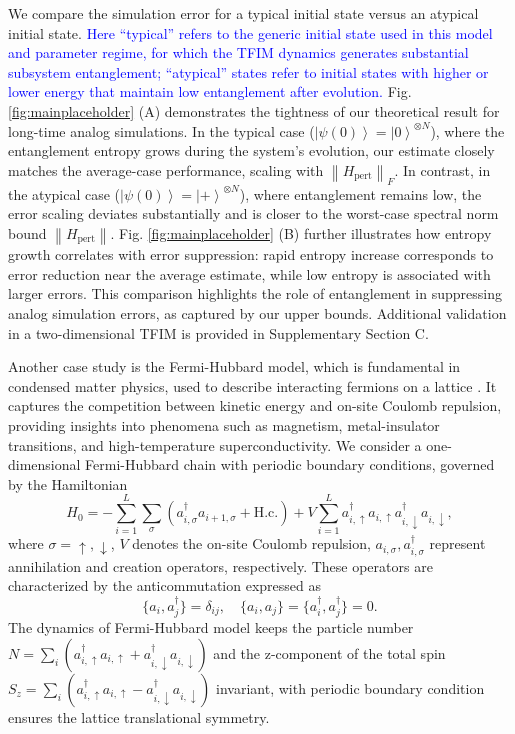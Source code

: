 \documentclass[12pt]{article}
\newcommand{\ket}[1]{\left|#1\right\rangle}
\newcommand{\norm}[1]{\left\lVert #1\right\rVert}
\begin{document}
We compare the simulation error
for a typical initial state versus an atypical initial state. \textcolor{blue}{Here ``typical'' refers to the generic initial state used in this model and parameter regime, for which the TFIM dynamics generates substantial subsystem entanglement; ``atypical'' states refer to initial states with higher or lower energy that maintain low entanglement after evolution.}
Fig. \ref{fig:mainplaceholder} (A) demonstrates the tightness of our theoretical result for long-time analog simulations. In the typical case ($\ket{\psi(0)}=\ket{0}^{\otimes N}$), where the entanglement entropy grows during the system's evolution, our estimate closely matches the average-case performance, scaling with $\norm{H_{\text{pert}}}_{F}$. In contrast, in the atypical case ($\ket{\psi(0)}=\ket{+}^{\otimes N}$), where entanglement remains low, the error scaling deviates substantially and is closer to the worst-case spectral norm bound $\norm{H_{\text{pert}}}$. 
Fig. \ref{fig:mainplaceholder} (B) further illustrates how entropy growth correlates with error suppression: rapid entropy increase corresponds to error reduction near the average estimate, while low entropy is associated with larger errors. This comparison highlights the role of entanglement in suppressing analog simulation errors, as captured by our upper bounds. Additional validation in a two-dimensional TFIM is provided in Supplementary Section C.








Another case study is the Fermi-Hubbard model, which is fundamental in condensed matter physics, used to describe interacting fermions on a lattice \cite{arovas2022hubbard,esslinger2010fermi,hart2015observation, shao2024antiferromagnetic}. It captures the competition between kinetic energy and on-site Coulomb repulsion, providing insights into phenomena such as magnetism, metal-insulator transitions, and high-temperature superconductivity. We consider a one-dimensional Fermi-Hubbard chain with periodic boundary conditions, governed by the Hamiltonian
\begin{equation}
    H_0=-\sum_{i=1}^L\sum_{\sigma}(a_{i,\sigma}^\dagger a_{i+1,\sigma}+\text{H.c.})+V\sum_{i=1}^La_{i,\uparrow}^\dagger a_{i,\uparrow}a_{i,\downarrow}^\dagger a_{i,\downarrow},
\end{equation}
where $\sigma=\uparrow, \downarrow$, $V$ denotes the on-site Coulomb repulsion, $a_{i,\sigma},a_{i,\sigma}^\dagger$ represent annihilation and creation operators, respectively.
These operators are characterized by the anticommutation expressed as
\begin{equation}
    \{a_i,a_j^\dagger\}=\delta_{ij},\quad \{a_i,a_j\}=\{a_i^\dagger,a_j^\dagger\}=0.
\end{equation}
The dynamics of Fermi-Hubbard model keeps the particle number $N=\sum_i(a^\dagger_{i,\uparrow}a_{i,\uparrow}+a^\dagger_{i,\downarrow}a_{i,\downarrow})$ and the z-component of the total spin $S_z=\sum_i(a^\dagger_{i,\uparrow}a_{i,\uparrow}-a^\dagger_{i,\downarrow}a_{i,\downarrow})$ invariant, with periodic boundary condition ensures the lattice translational symmetry.
\end{document}

